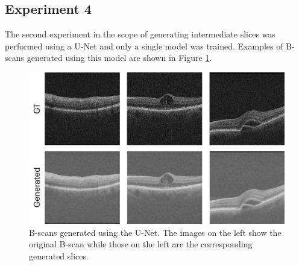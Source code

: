 \subsection{Experiment 4}

The second experiment in the scope of generating intermediate slices was performed using a U-Net and only a single model was trained. Examples of B-scans generated using this model are shown in Figure \ref{fig:GenerativeUNetResults}.

\begin{figure}[!ht]
	\centering	\includegraphics[width=1.0\linewidth]{figures/GenerativeUNetResults.png}
	\caption{B-scans generated using the U-Net. The images on the left show the original B-scan while those on the left are the corresponding generated slices.}
	\label{fig:GenerativeUNetResults}
\end{figure}


